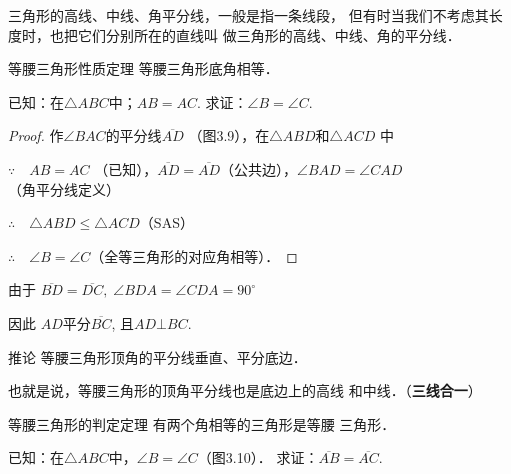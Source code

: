 三角形的高线、中线、角平分线，一般是指一条线段，
但有时当我们不考虑其长度时，也把它们分别所在的直线叫
做三角形的高线、中线、角的平分线．


\begin{blk}
    {等腰三角形性质定理} 等腰三角形底角相等．
\end{blk}

已知：在$\triangle ABC$中；$AB=AC$.
求证：$\angle B=\angle C$.

\begin{figure}[htp]
    \centering
{}
    \caption{}
\end{figure}
\begin{proof}
    作$\angle BAC$的平分线$\overline{AD}$
（图3.9），在$\triangle ABD$和$\triangle ACD$
中

$\because\quad AB=AC$ （已知），$\overline{AD}=\overline{AD}$（公共边），$\angle BAD=\angle CAD$（角平分线定义）

$\therefore\quad \triangle ABD≤\triangle ACD$（SAS）

$\therefore\quad \angle B=\angle C$（全等三角形的对应角相等）．
\end{proof}


由于 $\overline{BD}=\overline{DC},\; \angle BDA=\angle CDA=90^{\circ}$

因此 $AD$平分$\overline{BC}$, 且$AD\bot BC$.

\begin{blk}{推论 }
    等腰三角形顶角的平分线垂直、平分底边．
\end{blk}

也就是说，等腰三角形的顶角平分线也是底边上的高线
和中线．（\textbf{三线合一}）

\begin{blk}
    {等腰三角形的判定定理} 有两个角相等的三角形是等腰
三角形．
\end{blk}

已知：在$\triangle ABC$中，$\angle B=\angle C$（图3.10）．
求证：$\overline{AB}=\overline{AC}$.

\begin{figure}[htp]
    \centering
{}
    \caption{}
\end{figure}


